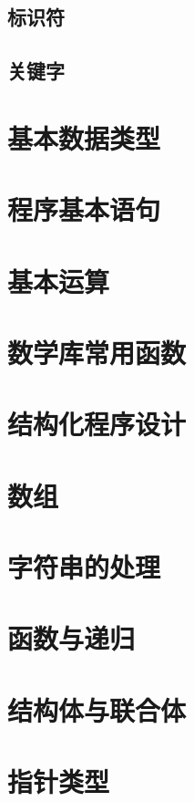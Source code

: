 \documentclass[12pt,twiside,a4paper]{ctexbook}
\numberwithin{chapter}{part}
\begin{document}
\section{标识符}

\section{关键字}

\chapter{基本数据类型}

\chapter{程序基本语句}

\chapter{基本运算}

\chapter{数学库常用函数}

\chapter{结构化程序设计}

\chapter{数组}

\chapter{字符串的处理}

\chapter{函数与递归}

\chapter{结构体与联合体}

\chapter{指针类型}
\end{document}
